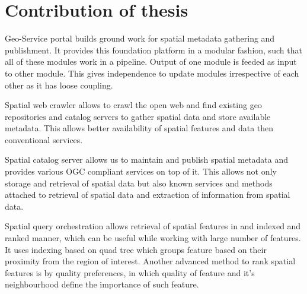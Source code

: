 \section{Contribution of thesis}
Geo-Service portal builds ground work for spatial metadata gathering and publishment. It provides this foundation platform in a modular fashion, such that all of these modules work in a pipeline. Output of one module is feeded as input to other module. This gives independence to update modules irrespective of each other as it has loose coupling.
\newline
\par Spatial web crawler allows to crawl the open web and find existing geo repositories and catalog servers to gather spatial data and store available metadata. This allows better availability of spatial features and data then conventional services.
\newline
\par Spatial catalog server allows us to maintain and publish spatial metadata and provides various OGC compliant services on top of it. This allows not only storage and retrieval of spatial data but also known services and methods attached to retrieval of spatial data and extraction of information from spatial data.
\newline
\par Spatial query orchestration allows retrieval of spatial features in and indexed and ranked manner, which can be useful while working with large number of features. It uses indexing based on quad tree which groups feature based on their proximity from the region of interest. Another advanced method to rank spatial features is by quality preferences, in which quality of feature and it's neighbourhood define the importance of such feature.

